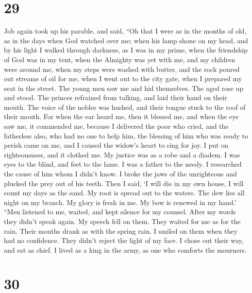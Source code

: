 \hypertarget{section-28}{%
\section{29}\label{section-28}}

 Job again took up his parable, and said, 
``Oh that I were as in the months of old, as in the days when God
watched over me;  when his lamp shone on my head, and by
his light I walked through darkness,  as I was in my
prime, when the friendship of God was in my tent,  when
the Almighty was yet with me, and my children were around me,
 when my steps were washed with butter, and the rock
poured out streams of oil for me,  when I went out to the
city gate, when I prepared my seat in the street.  The
young men saw me and hid themselves. The aged rose up and stood.
 The princes refrained from talking, and laid their hand
on their mouth.  The voice of the nobles was hushed, and
their tongue stuck to the roof of their mouth.  For when
the ear heard me, then it blessed me, and when the eye saw me, it
commended me,  because I delivered the poor who cried,
and the fatherless also, who had no one to help him,  the
blessing of him who was ready to perish came on me, and I caused the
widow's heart to sing for joy.  I put on righteousness,
and it clothed me. My justice was as a robe and a diadem.
 I was eyes to the blind, and feet to the lame.
 I was a father to the needy. I researched the cause of
him whom I didn't know.  I broke the jaws of the
unrighteous and plucked the prey out of his teeth.  Then
I said, `I will die in my own house, I will count my days as the sand.
 My root is spread out to the waters. The dew lies all
night on my branch.  My glory is fresh in me. My bow is
renewed in my hand.'  ``Men listened to me, waited, and
kept silence for my counsel.  After my words they didn't
speak again. My speech fell on them.  They waited for me
as for the rain. Their mouths drank as with the spring rain.
 I smiled on them when they had no confidence. They
didn't reject the light of my face.  I chose out their
way, and sat as chief. I lived as a king in the army, as one who
comforts the mourners.

\hypertarget{section-29}{%
\section{30}\label{section-29}}

